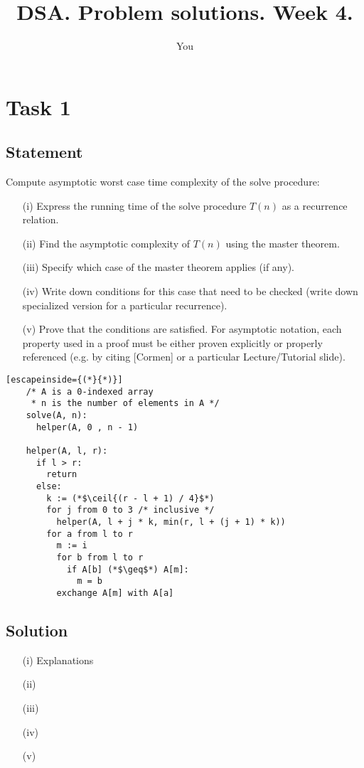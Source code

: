 \documentclass{article}
\title{DSA. Problem solutions. Week 4.}
\author{You}
\DeclarePairedDelimiter\ceil{\lceil}{\rceil}
\begin{document}
\maketitle


\section{Task 1}
\subsection{Statement}
Compute asymptotic worst case time complexity of the solve procedure:

\begin{enumerate}
    \setlength\itemsep{0em}
    \item[(i)] Express the running time of the solve procedure $T(n)$ as a recurrence relation.
    \item[(ii)] Find the asymptotic complexity of $T(n)$ using the master theorem. 
    \item[(iii)] Specify which case of the master theorem applies (if any).
    \item[(iv)] Write down conditions for this case that need to be checked (write down specialized version for a particular recurrence).
    \item[(v)] Prove that the conditions are satisfied. For asymptotic notation, each property used in a proof must be either proven explicitly or properly referenced (e.g. by citing [Cormen] or a particular Lecture/Tutorial slide).
\end{enumerate}

\begin{lstlisting}[escapeinside={(*}{*)}]
    /* A is a 0-indexed array
     * n is the number of elements in A */
    solve(A, n):
      helper(A, 0 , n - 1)
 
    helper(A, l, r):
      if l > r:
        return 
      else:
        k := (*$\ceil{(r - l + 1) / 4}$*) 
        for j from 0 to 3 /* inclusive */
          helper(A, l + j * k, min(r, l + (j + 1) * k))
        for a from l to r
          m := i
          for b from l to r
            if A[b] (*$\geq$*) A[m]:
              m = b
          exchange A[m] with A[a]
\end{lstlisting}

\subsection{Solution}
\begin{itemize}
    \setlength\itemsep{0em}
    \item [(i)] Explanations
    \item [(ii)] 
    \item [(iii)] 
    \item [(iv)] 
    \item [(v)] 
\end{itemize}
\end{document}
